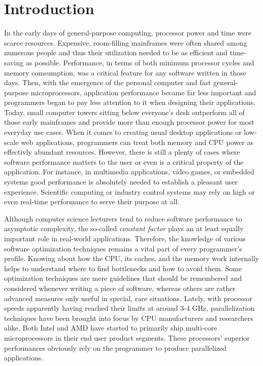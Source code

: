 \section{Introduction}
In the early days of general-purpose computing, processor power and time were scarce resources. Expensive, room-filling mainframes were often shared among numerous people and thus their utilization needed to be as efficient and time-saving as possible.   Performance, in terms of both minimum processor cycles and memory comsumption, was a critical feature for any software written in those days. Then, with the emergence of the personal computer and fast general-purpose microprocessors, application performance became far less important and programmers began to pay less attention to it when designing their applications. Today, small computer towers sitting below everyone's desk outperform all of those early mainframes and provide more than enough processor power for most everyday use cases. When it comes to creating usual desktop applications or low-scale web applications, programmers can treat both memory and CPU power as effectivly abundant resources. However, there is still a plenty of cases where software performance matters to the user or even is a critical property of the application. For instance, in multimedia applications, video games, or embedded systems good performance is absolutely needed to establish a pleasant user experience. Scientific computing or industry control systems may rely on high or even real-time performance to serve their purpose at all.

Although computer science lecturers tend to reduce software performance to asymptotic complexity, the so-called \emph{constant factor} plays an at least equally important role in real-world applications. Therefore, the knowledge of various software optimization techniques remains a vital part of every programmer's profile. Knowing about how the CPU, its caches, and the memory work internally helps to understand where to find bottlenecks and how to avoid them. Some optimization techniques are mere guidelines that should be remembered and considered whenever writing a piece of software, whereas others are rather advanced measures only useful in special, rare situations. Lately, with processor speeds apparently having reached their limits at around 3-4 GHz, parallelization techniques have been brought into focus by CPU manufacturers and researchers alike. Both Intel and AMD have started to primarily ship multi-core microprocessors in their end user product segments. These processors' superior performances obviously rely on the programmer to produce parallelized applications. 

